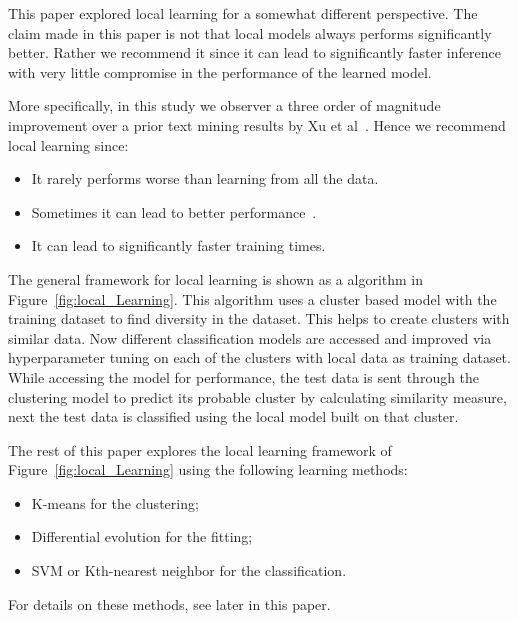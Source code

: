 \documentclass[sigconf]{acmart}
\theoremstyle{break}
\begin{document}
    This paper explored local learning
    for a somewhat different perspective.
     The claim made in this paper is not that local models always performs significantly better. Rather we     recommend it since it can lead to significantly faster inference with very little compromise in the performance
     of the learned model. 
     
     More specifically, in this study we observer a three order of magnitude improvement over a prior text mining results by Xu et al~\cite{xu2016predicting}. Hence we recommend local learning since:
    
     \begin{itemize}
        \item It rarely performs worse than learning from all the data.
        \item Sometimes it can lead to better performance~\cite{menzieslocal,menzies2011local,bettenburg2012think,posnett2011ecological}.
        \item It can lead to significantly faster training times.  
    \end{itemize}
    
    
    The general framework for local learning is shown as a algorithm in Figure~\ref{fig:local_Learning}. This algorithm uses a cluster based model with the training dataset to find diversity in the dataset. This helps to create clusters with similar data. Now different classification models are accessed and improved via hyperparameter tuning on each of the clusters with local data as training dataset. While accessing the model for performance, the test data is sent through the clustering model to predict its probable cluster by calculating similarity measure, next the test data is classified using the local model built on that cluster.
    
    The rest of this paper explores the local learning framework of Figure~\ref{fig:local_Learning} using 
    the following learning methods:
    \begin{itemize}
    \item
    K-means
    for the clustering;
    \item
    Differential evolution for the fitting;
    \item
    SVM or Kth-nearest neighbor for the classification.
    \end{itemize}
    For details on these methods, see later in this paper.
    
    
\end{document}
